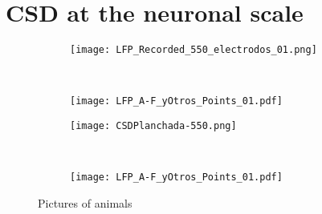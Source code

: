 \documentclass[letterpaper, 12pt]{article}
\begin{document}
\section*{CSD at the neuronal scale}

\begin{figure}[H]
  
    \begin{subfigure}[t]{0.3\textwidth}
     \texttt{[image: LFP\_Recorded\_550\_electrodos\_01.png]}
        \label{lfp01}
    \end{subfigure}
    ~ %
    \begin{subfigure}[b]{0.3\textwidth}
        \texttt{[image: LFP\_A-F\_yOtros\_Points\_01.pdf]}
        \label{lfptrazos}
    \end{subfigure}

    \begin{subfigure}[t]{0.3\textwidth}
     \texttt{[image: CSDPlanchada-550.png]}
        \label{lfp01}
    \end{subfigure}
    ~ %
    \begin{subfigure}[b]{0.3\textwidth}
        \texttt{[image: LFP\_A-F\_yOtros\_Points\_01.pdf]}
        \label{lfptrazos}
    \end{subfigure}

    
    \caption{Pictures of animals}\label{fig:animals}
\end{figure}
\end{document}
